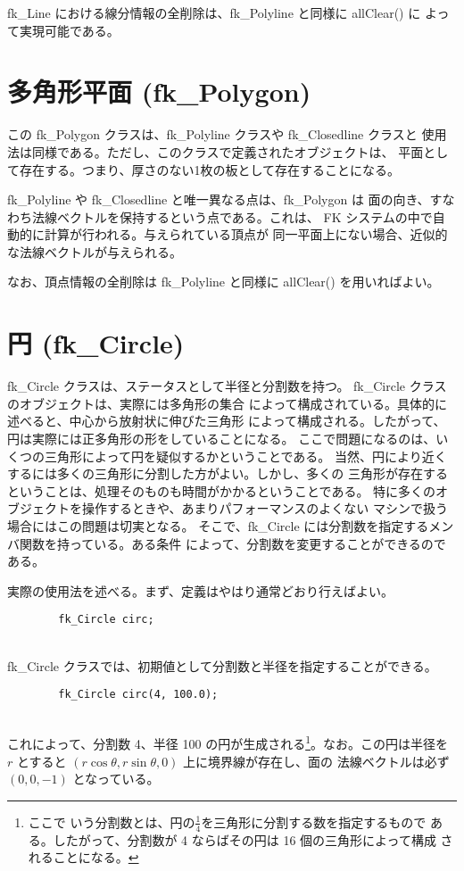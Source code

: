 fk\_Line における線分情報の全削除は、fk\_Polyline と同様に allClear() に
よって実現可能である。
\section{多角形平面 (fk\_Polygon)}
この fk\_Polygon クラスは、fk\_Polyline クラスや fk\_Closedline クラスと
使用法は同様である。ただし、このクラスで定義されたオブジェクトは、
平面として存在する。つまり、厚さのない1枚の板として存在することになる。

fk\_Polyline や fk\_Closedline と唯一異なる点は、fk\_Polygon は
面の向き、すなわち法線ベクトルを保持するという点である。これは、
FK システムの中で自動的に計算が行われる。与えられている頂点が
同一平面上にない場合、近似的な法線ベクトルが与えられる。

なお、頂点情報の全削除は fk\_Polyline と同様に allClear() を用いればよい。
\section{円 (fk\_Circle)}
fk\_Circle クラスは、ステータスとして半径と分割数を持つ。
fk\_Circle クラスのオブジェクトは、実際には多角形の集合
によって構成されている。具体的に述べると、中心から放射状に伸びた三角形
によって構成される。したがって、円は実際には正多角形の形をしていることになる。
ここで問題になるのは、いくつの三角形によって円を疑似するかということである。
当然、円により近くするには多くの三角形に分割した方がよい。しかし、多くの
三角形が存在するということは、処理そのものも時間がかかるということである。
特に多くのオブジェクトを操作するときや、あまりパフォーマンスのよくない
マシンで扱う場合にはこの問題は切実となる。
そこで、fk\_Circle には分割数を指定するメンバ関数を持っている。ある条件
によって、分割数を変更することができるのである。

実際の使用法を述べる。まず、定義はやはり通常どおり行えばよい。
\\
\begin{screen}
\begin{verbatim}
        fk_Circle circ;
\end{verbatim}
\end{screen}
~ \\
fk\_Circle クラスでは、初期値として分割数と半径を指定することができる。
\\
\begin{screen}
\begin{verbatim}
        fk_Circle circ(4, 100.0);
\end{verbatim}
\end{screen}
~ \\
これによって、分割数 4、半径 100 の円が生成される\footnote{ここで
いう分割数とは、円の\(\frac{1}{4}\)を三角形に分割する数を指定するもので
ある。したがって、分割数が 4 ならばその円は 16 個の三角形によって構成
されることになる。}。なお。この円は半径を \(r\) とすると
\( (r\cos \theta , r\sin \theta , 0)\) 上に境界線が存在し、面の
法線ベクトルは必ず \((0, 0, -1)\) となっている。

